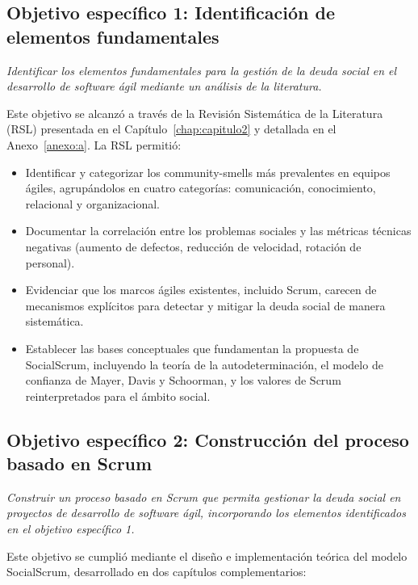 \subsection{Objetivo específico 1: Identificación de elementos fundamentales}

\textit{Identificar los elementos fundamentales para la gestión de la deuda social en el desarrollo de software ágil mediante un análisis de la literatura.}

Este objetivo se alcanzó a través de la Revisión Sistemática de la Literatura (RSL) presentada en el Capítulo~\ref{chap:capitulo2} y detallada en el Anexo~\ref{anexo:a}. La RSL permitió:

\begin{itemize}
    \item Identificar y categorizar los \gls{community-smells} más prevalentes en equipos ágiles, agrupándolos en cuatro categorías: comunicación, conocimiento, relacional y organizacional.
    \item Documentar la correlación entre los problemas sociales y las métricas técnicas negativas (aumento de defectos, reducción de velocidad, rotación de personal).
    \item Evidenciar que los marcos ágiles existentes, incluido Scrum, carecen de mecanismos explícitos para detectar y mitigar la deuda social de manera sistemática.
    \item Establecer las bases conceptuales que fundamentan la propuesta de SocialScrum, incluyendo la teoría de la autodeterminación, el modelo de confianza de Mayer, Davis y Schoorman, y los valores de Scrum reinterpretados para el ámbito social.
\end{itemize}

\subsection{Objetivo específico 2: Construcción del proceso basado en Scrum}

\textit{Construir un proceso basado en Scrum que permita gestionar la deuda social en proyectos de desarrollo de software ágil, incorporando los elementos identificados en el objetivo específico 1.}

Este objetivo se cumplió mediante el diseño e implementación teórica del modelo SocialScrum, desarrollado en dos capítulos complementarios:

